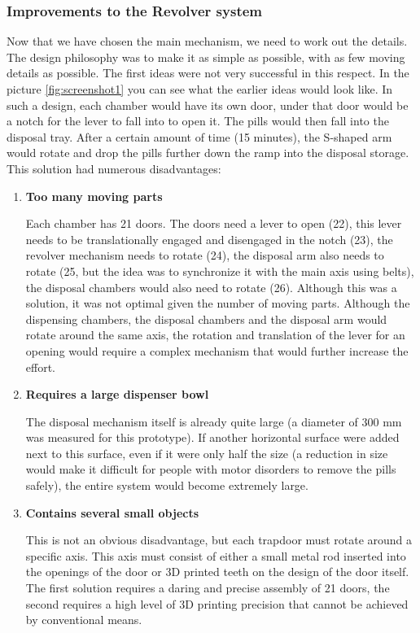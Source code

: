 \subsubsection{Improvements to the Revolver system}
Now that we have chosen the main mechanism, we need to work out the details. The design philosophy was to make it as simple as possible, with as few moving details as possible. The first ideas were not very successful in this respect. In the picture \ref{fig:screenshot1} you can see what the earlier ideas would look like. In such a design, each chamber would have its own door, under that door would be a notch for the lever to fall into to open it. The pills would then fall into the disposal tray. After a certain amount of time (15 minutes), the S-shaped arm would rotate and drop the pills further down the ramp into the disposal storage. This solution had numerous disadvantages:
\begin{enumerate}
	\item{\textbf{Too many moving parts}}
	
	Each chamber has 21 doors. The doors need a lever to open (22), this lever needs to be translationally engaged and disengaged in the notch (23), the revolver mechanism needs to rotate (24), the disposal arm also needs to rotate (25, but the idea was to synchronize it with the main axis using belts), the disposal chambers would also need to rotate (26). Although this was a solution, it was not optimal given the number of moving parts. Although the dispensing chambers, the disposal chambers and the disposal arm would rotate around the same axis, the rotation and translation of the lever for an opening would require a complex mechanism that would further increase the effort.
	\item{\textbf{Requires a large dispenser bowl}}
	
	The disposal mechanism itself is already quite large (a diameter of 300 mm was measured for this prototype). If another horizontal surface were added next to this surface, even if it were only half the size (a reduction in size would make it difficult for people with motor disorders to remove the pills safely), the entire system would become extremely large.
	\item{\textbf{Contains several small objects}}
	
	This is not an obvious disadvantage, but each trapdoor must rotate around a specific axis. This axis must consist of either a small metal rod inserted into the openings of the door or 3D printed teeth on the design of the door itself. The first solution requires a daring and precise assembly of 21 doors, the second requires a high level of 3D printing precision that cannot be achieved by conventional means.
\end{enumerate}
